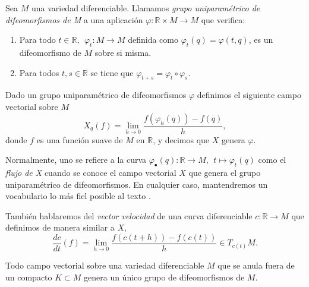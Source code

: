 \begin{definition}
    Sea $M$ una variedad diferenciable. Llamamos \textit{grupo uniparamétrico de difeomorfismos de M} a una aplicación $\varphi:\mathbb{R}\times M \to M$ que verifica:
    \begin{enumerate}[label=\roman*)]
        \item Para todo $t\in \mathbb{R},~~ \varphi_t:M\to M$ definida como $\varphi_t(q)=\varphi(t,q)$, es un difeomorfismo de $M$ sobre si misma.

        \item Para todos $t, s\in\mathbb{R}$ se tiene que $\varphi_{t+s}=\varphi_t\circ \varphi_s$.
    \end{enumerate}
\end{definition}

\bigskip

Dado un grupo uniparamétrico de difeomorfismos $\varphi$ definimos el siguiente campo vectorial sobre $M$
\begin{equation*}
    X_q(f)=\lim_{h\to 0}\frac{f(\varphi_h(q))-f(q)}{h},
\end{equation*}
donde $f$ es una función suave de $M$ en $\mathbb{R}$, y decimos que $X$ genera $\varphi$.

Normalmente, uno se refiere a la curva $\varphi_\bullet(q): \mathbb{R}\to M,~~ t\mapsto \varphi_t(q)$ como el \textit{flujo de X} cuando se conoce el campo vectorial $X$ que genera el grupo uniparamétrico de difeomorfismos. En cualquier caso, mantendremos un vocabulario lo más fiel posible al texto \cite{milnor1963}.

También hablaremos del \textit{vector velocidad} de una curva diferenciable $c:\mathbb{R}\to M$ que definimos de manera similar a $X$,
\begin{equation*}
    \frac{dc}{dt}(f)= \lim_{h\to 0}\frac{f(c(t+h))-f(c(t))}{h}\in T_{c(t)}M .
\end{equation*} 

\bigskip
\begin{lemma}
\label{unidiff}
    Todo campo vectorial sobre una variedad diferenciable $M$ que se anula fuera de un compacto $K\subset M$ genera un único grupo de difeomorfismos de $M$.
\end{lemma}

